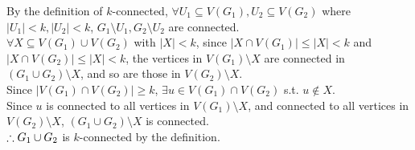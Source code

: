 \setcounter{pr}{5}
\begin{pr}
By the definition of $k$-connected, $\forall U_1\subseteq V(G_1), U_2\subseteq V(G_2)$ where $|U_1|<k, |U_2|<k$, $G_1\setminus U_1, G_2\setminus U_2$ are connected.\\
$\forall X\subseteq V(G_1)\cup V(G_2)$ with $|X|<k$, since $|X\cap V(G_1)|\leq|X|<k$ and $|X\cap V(G_2)|\leq|X|<k$, the vertices in $V(G_1)\setminus X$ are connected in $(G_1\cup G_2)\setminus X$, and so are those in $V(G_2)\setminus X$.\\
Since $|V(G_1)\cap V(G_2)|\geq k$, $\exists u\in V(G_1)\cap V(G_2)$ s.t. $u\notin X$.\\
Since $u$ is connected to all vertices in $V(G_1)\setminus X$, and connected to all vertices in $V(G_2)\setminus X$, $(G_1\cup G_2)\setminus X$ is connected.\\
$\therefore G_1\cup G_2$ is $k$-connected by the definition.
\end{pr}
